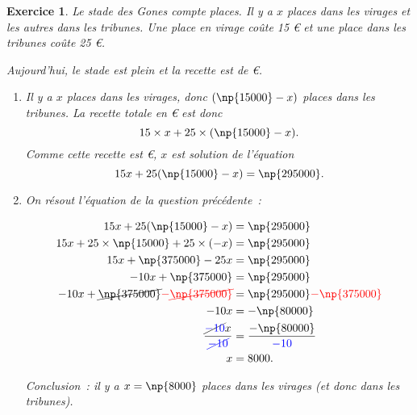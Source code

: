 \documentclass[10pt]{article}
\newtheorem{exo}{Exercice}
\begin{document}
\begin{exo}

Le stade des Gones compte  places. Il y a $x$ places dans les virages et les autres dans les tribunes. Une place en virage coûte 15 € et une place dans les tribunes coûte 25 €.

\medskip

Aujourd'hui, le stade est plein et la recette est de  €.

\begin{enumerate}
\item Il y a $x$ places dans les virages, donc $(\np{15000}-x)$ places dans les tribunes. La recette totale en € est donc
\[15\times x+25\times(\np{15000}-x).\] Comme cette recette est  €, $x$ est solution de l'équation
\[15 x+25(\np{15000}-x)=\np{295000}.\]
\item On résout l'équation de la question précédente~:

\begin{align*}
15 x+25(\np{15000}-x)&=\np{295000}\\
15x+25\times\np{15000}+25\times (-x)&=\np{295000}\\
15x+\np{375000}-25x&=\np{295000}\\
-10x+\np{375000}&=\np{295000}\\
-10x+\cancel{\np{375000}}\textcolor{red}{-\cancel{\np{375000}}}&=\np{295000}\textcolor{red}{-\np{375000}}\\
-10x&=-\np{80000}\\
\frac{\cancel{\textcolor{blue}{-10}}x}{\textcolor{blue}{\cancel{-10}}}&=\frac{-\np{80000}}{\textcolor{blue}{{-10}}}\\
x&=8000.\end{align*}

\medskip

Conclusion~: il y a $x=\np{8000}$ places dans les virages (et donc  dans les tribunes).
\end{enumerate}


\end{exo}
\end{document}
